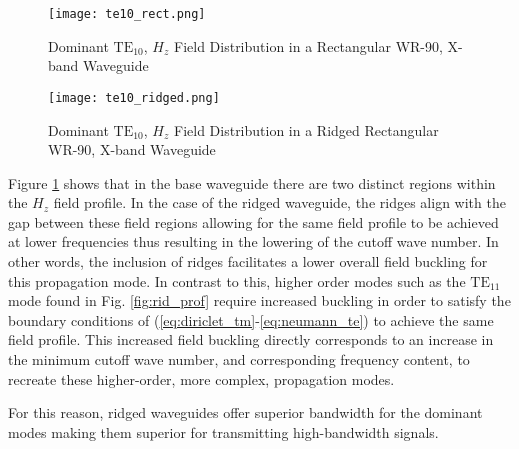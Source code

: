 \begin{figure}[h!]  
	\centering
	\texttt{[image: te10\_rect.png]} 
	\caption{Dominant $\mathrm{TE_{10}}$, $H_z$ Field Distribution in a Rectangular WR-90, X-band Waveguide}
	\label{fig:rec_te10}
\end{figure}

\begin{figure}[h!]  
	\centering
	\texttt{[image: te10\_ridged.png]} 
	\caption{Dominant $\mathrm{TE_{10}}$, $H_z$ Field Distribution in a Ridged Rectangular WR-90, X-band Waveguide}
	\label{fig:rid_te10}
\end{figure}

Figure \ref{fig:rec_te10} shows that in the base waveguide there are two distinct regions within the $H_z$ field profile. In the case of the ridged waveguide, the ridges align with the gap between these field regions allowing for the same field profile to be achieved at lower frequencies thus resulting in the lowering of the cutoff wave number. In other words, the inclusion of ridges facilitates a lower overall field buckling for this propagation mode. In contrast to this, higher order modes such as the $\mathrm{TE}_11$ mode found in Fig. \ref{fig:rid_prof} require increased buckling in order to satisfy the boundary conditions of (\ref{eq:diriclet_tm}-\ref{eq:neumann_te}) to achieve the same field profile. This increased field buckling directly corresponds to an increase in the minimum cutoff wave number, and corresponding frequency content, to recreate these higher-order, more complex, propagation modes.

For this reason, ridged waveguides offer superior bandwidth for the dominant modes making them superior for transmitting high-bandwidth signals.   
